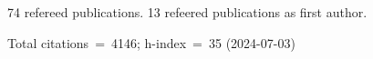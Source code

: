 74 refereed publications. 13 refeered publications as first author.

Total citations~=~4146; h-index~=~35 (2024-07-03)